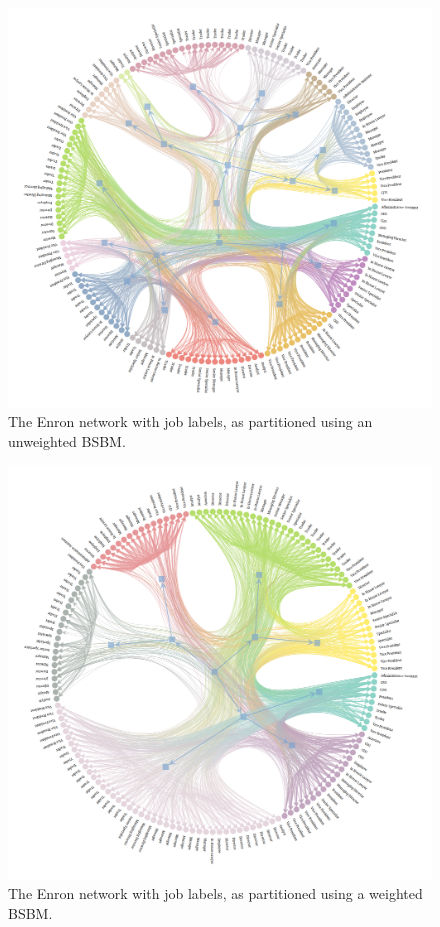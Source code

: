 \documentclass[
  12pt,
  a4paper,
  DIV=11,
  numbers=noendperiod,
  twoside,
  open=any]{scrartcl}
\begin{document}
\begin{figure}

\includegraphics{figures/Browne-Crick-McLevey-2023-Figure-1.png}

\caption{\label{fig-1}The Enron network with job labels, as partitioned
using an unweighted BSBM.}

\end{figure}%

\begin{figure}

\includegraphics{figures/Browne-Crick-McLevey-2023-Figure-2.png}

\caption{\label{fig-2}The Enron network with job labels, as partitioned
using a weighted BSBM.}

\end{figure}%
\end{document}
